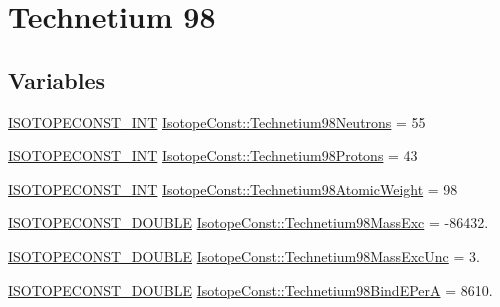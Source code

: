 \hypertarget{group___isotope_const-_technetium-_tc98}{}\section{Technetium 98}
\label{group___isotope_const-_technetium-_tc98}
\subsection*{Variables}
\begin{DoxyCompactItemize}
\item 
\mbox{\hyperlink{group___isotope_const-_macros_ga5f18360b3e99483a35c32d789e62621c}{I\+S\+O\+T\+O\+P\+E\+C\+O\+N\+S\+T\+\_\+\+I\+NT}} \mbox{\hyperlink{group___isotope_const-_technetium-_tc98_ga94c7857f27377e9988ee36a4a208ccd2}{Isotope\+Const\+::\+Technetium98\+Neutrons}} = 55
\item 
\mbox{\hyperlink{group___isotope_const-_macros_ga5f18360b3e99483a35c32d789e62621c}{I\+S\+O\+T\+O\+P\+E\+C\+O\+N\+S\+T\+\_\+\+I\+NT}} \mbox{\hyperlink{group___isotope_const-_technetium-_tc98_gac87b061b206fdd204f5bc412e5245e89}{Isotope\+Const\+::\+Technetium98\+Protons}} = 43
\item 
\mbox{\hyperlink{group___isotope_const-_macros_ga5f18360b3e99483a35c32d789e62621c}{I\+S\+O\+T\+O\+P\+E\+C\+O\+N\+S\+T\+\_\+\+I\+NT}} \mbox{\hyperlink{group___isotope_const-_technetium-_tc98_ga5aa36791f5a705ed28d5039cec62d818}{Isotope\+Const\+::\+Technetium98\+Atomic\+Weight}} = 98
\item 
\mbox{\hyperlink{group___isotope_const-_macros_ga8f45a7272ce02c0b4c65c44636ed719a}{I\+S\+O\+T\+O\+P\+E\+C\+O\+N\+S\+T\+\_\+\+D\+O\+U\+B\+LE}} \mbox{\hyperlink{group___isotope_const-_technetium-_tc98_gab0e89145c01f3d018b683f307170c38c}{Isotope\+Const\+::\+Technetium98\+Mass\+Exc}} = -\/86432.
\item 
\mbox{\hyperlink{group___isotope_const-_macros_ga8f45a7272ce02c0b4c65c44636ed719a}{I\+S\+O\+T\+O\+P\+E\+C\+O\+N\+S\+T\+\_\+\+D\+O\+U\+B\+LE}} \mbox{\hyperlink{group___isotope_const-_technetium-_tc98_ga31ee4ceca93c724f575167cbc897ae62}{Isotope\+Const\+::\+Technetium98\+Mass\+Exc\+Unc}} = 3.
\item 
\mbox{\hyperlink{group___isotope_const-_macros_ga8f45a7272ce02c0b4c65c44636ed719a}{I\+S\+O\+T\+O\+P\+E\+C\+O\+N\+S\+T\+\_\+\+D\+O\+U\+B\+LE}} \mbox{\hyperlink{group___isotope_const-_technetium-_tc98_gaeaeb74873c0a73d010833e981d399ff7}{Isotope\+Const\+::\+Technetium98\+Bind\+E\+PerA}} = 8610.
\item 

\end{DoxyCompactItemize}
